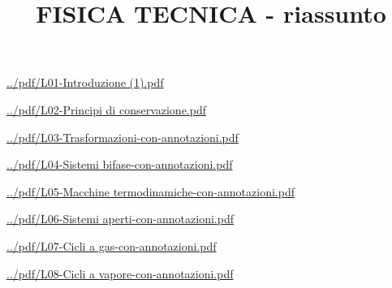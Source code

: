 \documentclass[a4paper, 9pt]{article}
\title{FISICA TECNICA - riassunto}
\begin{document}
    \maketitle
    \tableofcontents{}
    \newpage
    \url{../pdf/L01-Introduzione (1).pdf}
    
    \newpage
    \url{../pdf/L02-Principi di conservazione.pdf}
    
    \newpage
    \url{../pdf/L03-Trasformazioni-con-annotazioni.pdf}
    
    \newpage
    \url{../pdf/L04-Sistemi bifase-con-annotazioni.pdf}
    
    \newpage
    \url{../pdf/L05-Macchine termodinamiche-con-annotazioni.pdf}
    
    \newpage
    \url{../pdf/L06-Sistemi aperti-con-annotazioni.pdf}
    
    \newpage
    \url{../pdf/L07-Cicli a gas-con-annotazioni.pdf}
    
    \newpage
    \url{../pdf/L08-Cicli a vapore-con-annotazioni.pdf}
    
\end{document}

